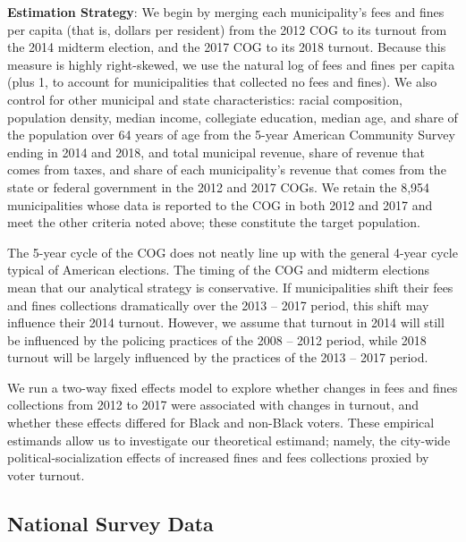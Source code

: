 \documentclass[
  12pt,
]{article}
\begin{document}
\textbf{Estimation Strategy}: We begin by merging each municipality's fees and fines per capita (that is, dollars per resident) from the 2012 COG to its turnout from the 2014 midterm election, and the 2017 COG to its 2018 turnout. Because this measure is highly right-skewed, we use the natural log of fees and fines per capita (plus 1, to account for municipalities that collected no fees and fines). We also control for other municipal and state characteristics: racial composition, population density, median income, collegiate education, median age, and share of the population over 64 years of age from the 5-year American Community Survey ending in 2014 and 2018, and total municipal revenue, share of revenue that comes from taxes, and share of each municipality's revenue that comes from the state or federal government in the 2012 and 2017 COGs. We retain the 8,954 municipalities whose data is reported to the COG in both 2012 and 2017 and meet the other criteria noted above; these constitute the target population.

The 5-year cycle of the COG does not neatly line up with the general 4-year cycle typical of American elections. The timing of the COG and midterm elections mean that our analytical strategy is conservative. If municipalities shift their fees and fines collections dramatically over the 2013 -- 2017 period, this shift may influence their 2014 turnout. However, we assume that turnout in 2014 will still be influenced by the policing practices of the 2008 -- 2012 period, while 2018 turnout will be largely influenced by the practices of the 2013 -- 2017 period.

We run a two-way fixed effects model to explore whether changes in fees and fines collections from 2012 to 2017 were associated with changes in turnout, and whether these effects differed for Black and non-Black voters. These empirical estimands allow us to investigate our theoretical estimand; namely, the city-wide political-socialization effects of increased fines and fees collections proxied by voter turnout.

\hypertarget{national-survey-data}{%
\subsection*{National Survey Data}\label{national-survey-data}}
\end{document}
